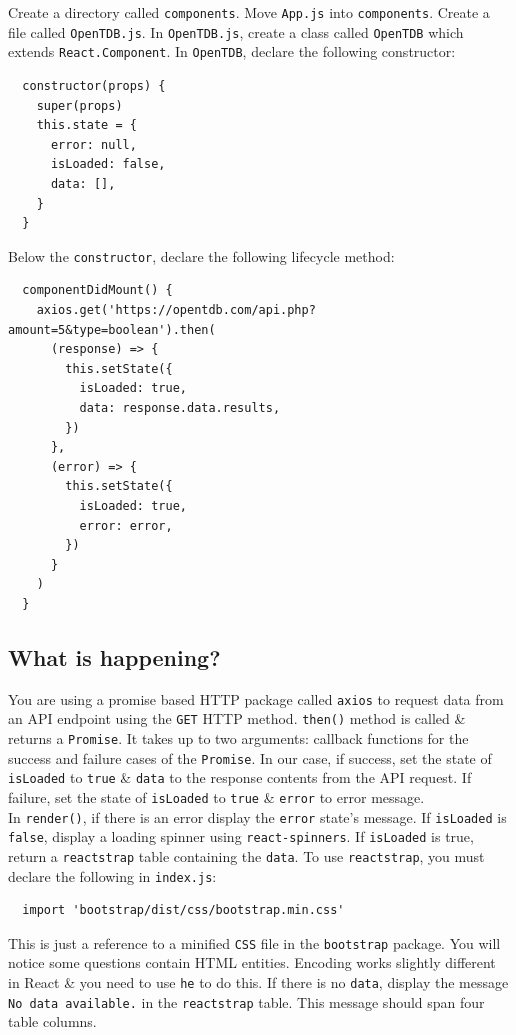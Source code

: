 \documentclass{article}
\begin{document}
Create a directory called \texttt{components}. Move \texttt{App.js} into \texttt{components}. Create a file called \texttt{OpenTDB.js}. In \texttt{OpenTDB.js}, create a class called \texttt{OpenTDB} which extends \texttt{React.Component}. In \texttt{OpenTDB}, declare the following constructor:
\begin{verbatim}
  constructor(props) {
    super(props)
    this.state = {
      error: null,
      isLoaded: false,
      data: [],
    }
  }
\end{verbatim}

Below the \texttt{constructor}, declare the following lifecycle method:
\begin{verbatim}
  componentDidMount() {
    axios.get('https://opentdb.com/api.php?amount=5&type=boolean').then(
      (response) => {
        this.setState({
          isLoaded: true,
          data: response.data.results,
        })
      },
      (error) => {
        this.setState({
          isLoaded: true,
          error: error,
        })
      }
    )
  }
\end{verbatim}

\subsection*{What is happening?} 
You are using a promise based HTTP package called \texttt{axios} to request data from an API endpoint using the \texttt{GET} HTTP method. \texttt{then()} method is called \& returns a \texttt{Promise}. It takes up to two arguments: callback functions for the success and failure cases of the \texttt{Promise}. In our case, if success, set the state of \texttt{isLoaded} to \texttt{true} \& \texttt{data} to the response contents from the API request. If failure, set the state of \texttt{isLoaded} to \texttt{true} \& \texttt{error} to error message. \\

In \texttt{render()}, if there is an error display the \texttt{error} state's message. If \texttt{isLoaded} is \texttt{false}, display a loading spinner using \texttt{react-spinners}. If \texttt{isLoaded} is true, return a \texttt{reactstrap} table containing the \texttt{data}. To use \texttt{reactstrap}, you must declare the following in \texttt{index.js}:

\begin{verbatim}
  import 'bootstrap/dist/css/bootstrap.min.css'
\end{verbatim}

This is just a reference to a minified \texttt{CSS} file in the \texttt{bootstrap} package. You will notice some questions contain HTML entities. Encoding works slightly different in React \& you need to use \texttt{he} to do this. If there is no \texttt{data}, display the message \texttt{No data available.} in the \texttt{reactstrap} table. This message should span four table columns. \\
\end{document}
